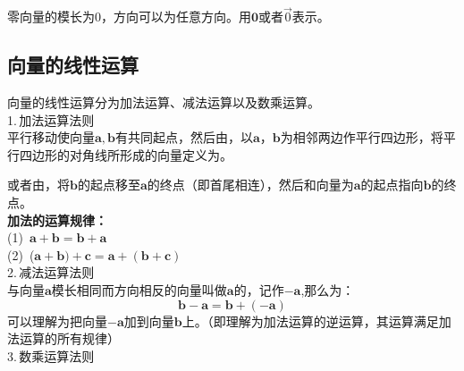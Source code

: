 \sj
{}
零向量的模长为0，方向可以为任意方向。用$\boldsymbol{0}$或者$\vec{0}$表示。
\subsection{向量的线性运算}
向量的线性运算分为加法运算、减法运算以及数乘运算。
\\ 1.$\,$加法运算法则\\

\sj\sj
{}
平行移动使向量$\boldsymbol{a},\boldsymbol{b}$有共同起点，然后由，以$\boldsymbol{a}，\boldsymbol{b}$为相邻两边作平行四边形，将平行四边形的对角线所形成的向量定义为。
\par 或者由，将$\boldsymbol{b}$的起点移至$\boldsymbol{a}$的终点（即首尾相连），然后和向量为$\boldsymbol{a}$的起点指向$\boldsymbol{b}$的终点。
\\ \textbf{加法的运算规律：}\\
(1)$\,$  \qquad $\boldsymbol{a}+\boldsymbol{b}=\boldsymbol{b}+\boldsymbol{a} $\\
(2)$\,$  \qquad ($\boldsymbol{a}+\boldsymbol{b})+\boldsymbol{c}=\boldsymbol{a}+(\boldsymbol{b}+\boldsymbol{c}) $\\
2.$\,$减法运算法则\\

\sj\sj
{}
与向量$\boldsymbol{a}$模长相同而方向相反的向量叫做$\boldsymbol{a}$的，记作$-\boldsymbol{a}$,那么为：
\begin{equation}
	\boldsymbol{b}-\boldsymbol{a}=\boldsymbol{b}+(-\boldsymbol{a})
\end{equation}
可以理解为把向量$-\boldsymbol{a}$加到向量$\boldsymbol{b}$上。（即理解为加法运算的逆运算，其运算满足加法运算的所有规律）
\\ 3.$\,$数乘运算法则\\

